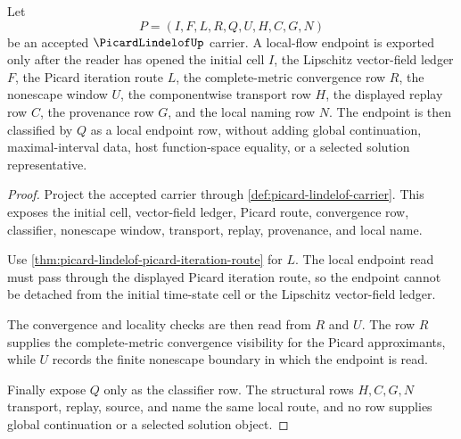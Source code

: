 \begin{theorem}
\label{thm:picard-lindelof-local-existence-handoff}
Let
$$
P=(I,F,L,R,Q,U,H,C,G,N)
$$
be an accepted $\PicardLindelofUp$ carrier. A local-flow endpoint is exported only after the reader has opened the initial cell $I$, the Lipschitz vector-field ledger $F$, the Picard iteration route $L$, the complete-metric convergence row $R$, the nonescape window $U$, the componentwise transport row $H$, the displayed replay row $C$, the provenance row $G$, and the local naming row $N$. The endpoint is then classified by $Q$ as a local endpoint row, without adding global continuation, maximal-interval data, host function-space equality, or a selected solution representative.
\end{theorem}
\begin{proof}
Project the accepted carrier through \autoref{def:picard-lindelof-carrier}. This exposes the initial cell, vector-field ledger, Picard route, convergence row, classifier, nonescape window, transport, replay, provenance, and local name.

Use \autoref{thm:picard-lindelof-picard-iteration-route} for $L$. The local endpoint read must pass through the displayed Picard iteration route, so the endpoint cannot be detached from the initial time-state cell or the Lipschitz vector-field ledger.

The convergence and locality checks are then read from $R$ and $U$. The row $R$ supplies the complete-metric convergence visibility for the Picard approximants, while $U$ records the finite nonescape boundary in which the endpoint is read.

Finally expose $Q$ only as the classifier row. The structural rows $H,C,G,N$ transport, replay, source, and name the same local route, and no row supplies global continuation or a selected solution object.
\end{proof}

